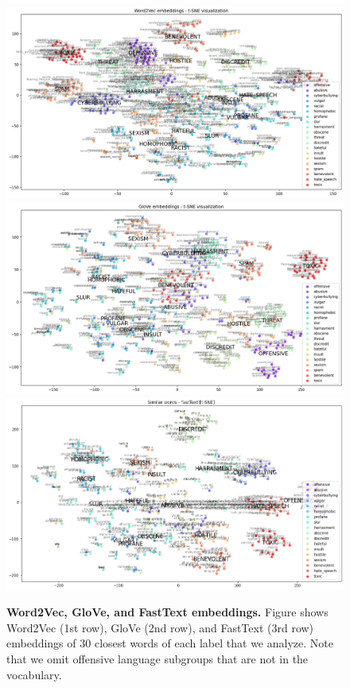 \documentclass[fleqn,moreauthors,10pt]{ds_report}
\begin{document}
\begin{figure}[!t]
	\centering
	\includegraphics[width=\linewidth]{SimilarWords - word2vec - t-SNE_1.png}
	\includegraphics[width=\linewidth]{SimilarWords - Glove - t-SNE_1.png}
	\includegraphics[width=\linewidth]{SimilarWords - FastText - t-SNE_1.png}
	\caption{\textbf{Word2Vec, GloVe, and FastText embeddings.} Figure shows Word2Vec (1st row), GloVe (2nd row), and FastText (3rd row) embeddings of $30$ closest words of each label that we analyze. Note that we omit offensive language subgroups that are not in the vocabulary.}
	\label{fig:embedding_labels}
\end{figure}
\end{document}
